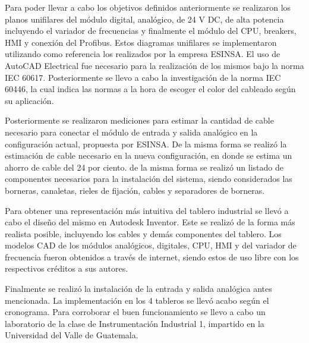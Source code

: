 Para poder llevar a cabo los objetivos definidos anteriormente se realizaron los planos unifilares del módulo digital, analógico, de 24 V DC, de alta potencia incluyendo el variador de frecuencias y finalmente el módulo del CPU, breakers, HMI y conexión del Profibus. Estos diagramas unifilares se implementaron utilizando como referencia los realizados por la empresa ESINSA. El uso de AutoCAD Electrical fue necesario para la realización de los mismos bajo la norma IEC 60617. Posteriormente se llevo a cabo la investigación de la norma IEC 60446, la cual indica las normas a la hora de escoger el color del cableado según su aplicación. 

Posteriormente se realizaron mediciones para estimar la cantidad de cable necesario para conectar el módulo de entrada y salida analógico en la configuración actual, propuesta por ESINSA. De la misma forma se realizó la estimación de cable necesario en la nueva configuración, en donde se estima un ahorro de cable del 24 por ciento. de la misma forma se realizó un listado de componentes necesarios para la instalación del sistema, siendo considerados las borneras, canaletas, rieles de fijación, cables y separadores de borneras. 

Para obtener una representación más intuitiva del tablero industrial se llevó a cabo el diseño del mismo en Autodesk Inventor. Este se realizó de la forma más realista posible, incluyendo los cables y demás componentes del tablero. Los modelos CAD de los módulos analógicos, digitales, CPU, HMI y del variador de frecuencia fueron obtenidos a través de internet, siendo estos de uso libre con los respectivos créditos a sus autores. 

Finalmente se realizó la instalación de la entrada y salida analógica antes mencionada. La implementación en los 4 tableros se llevó acabo según el cronograma. Para corroborar el buen funcionamiento se llevo a cabo un laboratorio de la clase de Instrumentación Industrial 1, impartido en la Universidad del Valle de Guatemala.
